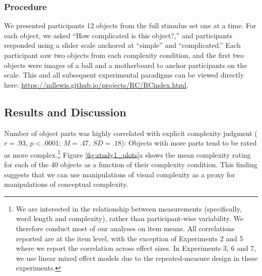 \documentclass[man]{apa2}
\begin{document}
\subsubsection{Procedure}
We presented participants 12 objects from the full stimulus set one at a time. For each object, we asked ``How complicated is this object?,'' and participants responded using a slider scale anchored at ``simple'' and ``complicated.'' Each participant saw two objects from each complexity condition, and the first two objects were images of a ball and a motherboard to anchor participants on the scale. This and all subsequent experimental paradigms can be viewed directly here: \url{https://mllewis.github.io/projects/RC/RCindex.html}.

\subsection{Results and Discussion}
Number of object parts was highly correlated with explicit complexity judgment ($r = .93$, $p < .0001$; $M = .47$, $SD = .18$): Objects with more parts tend to be rated as more complex.\footnote{We are interested in the relationship between measurements (specifically, word length and complexity), rather than participant-wise variability. We therefore conduct most of our analyses on item means. All correlations reported are at the item level, with the exception of Experiments 2 and 5 where we report the correlation across effect sizes. In Experiments 3, 6 and 7, we use linear mixed effect models due to the repeated-measure design in these experiments.} Figure \ref{fig:study1_plots}a shows the mean complexity rating for each of the 40 objects as a function of their complexity condition. This finding suggests that we can use manipulations of visual complexity as a proxy for manipulations of conceptual complexity.
\end{document}
